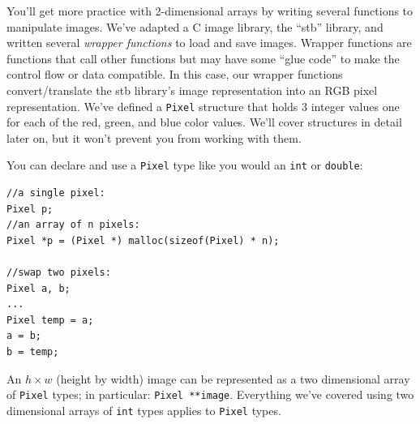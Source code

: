 \documentclass[12pt]{scrartcl}
\begin{document}
You'll get more practice with 2-dimensional arrays by writing several
functions to manipulate images.  We've adapted a C image library, the 
``stb'' library, and written several \emph{wrapper functions} to load
and save images.  Wrapper functions are functions that call other
functions but may have some ``glue code'' to make the control flow or
data compatible.  In this case, our wrapper functions convert/translate
the stb library's image representation into an RGB pixel representation.
We've defined a \texttt{Pixel} structure that holds 3 integer
values one for each of the red, green, and blue color values.  We'll
cover structures in detail later on, but it won't prevent you from working
with them.  

You can declare and use a \texttt{Pixel} type like you would 
an \texttt{int} or \texttt{double}: 

\begin{verbatim}
//a single pixel:
Pixel p;
//an array of n pixels:
Pixel *p = (Pixel *) malloc(sizeof(Pixel) * n);

//swap two pixels:
Pixel a, b;
...
Pixel temp = a;
a = b;
b = temp;
\end{verbatim} 

An $h \times w$ (height by width) image can be represented as a two dimensional
array of \texttt{Pixel} types; in particular: \texttt{Pixel **image}.
Everything we've covered using two dimensional arrays of \texttt{int} types
applies to \texttt{Pixel} types.
\end{document}
